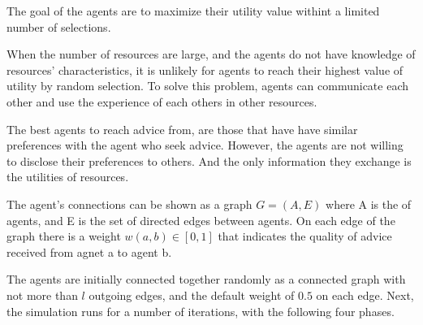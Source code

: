 \documentclass [12pt]{article} \usepackage{multicol}
\begin{document}
The goal of the agents are to maximize their utility value  withint a limited number of selections.

When the number of resources are large, and the agents do not have knowledge of resources' characteristics, it is unlikely for agents 
to reach their highest value of utility by random selection. To solve this problem, agents can communicate each other and use the experience of
each others in other resources. 

The best agents to reach advice from, are those that have have similar preferences with the agent who seek advice.
However, the agents are not willing to disclose their preferences to others. And the only information they exchange is the utilities of resources.   


The agent's connections can be shown as a graph $G = (A, E) $ where A is the of agents, and E is the set of directed edges between agents.
On each edge of the graph there is a weight $w(a,b) \in  [0,1]$ that indicates the quality of advice received from agnet a to agent b. 

The agents are initially connected together randomly as a connected graph with not more than $l$ outgoing edges, and the default weight
of $0.5$ on each edge. Next, the simulation runs for a number of iterations, with the following four phases.
\end{document}

